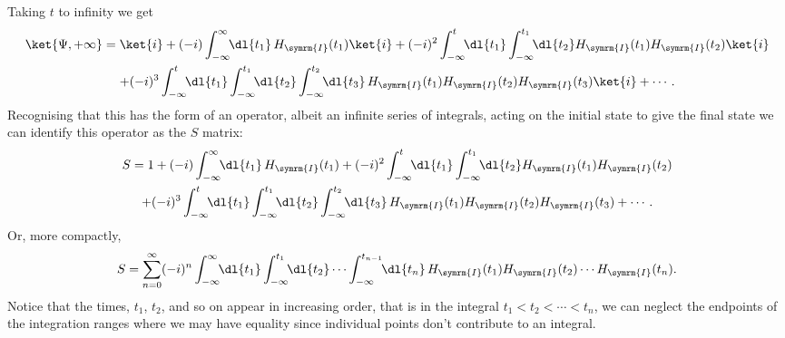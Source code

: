 \documentclass[fleqn]{NotesClass}
\newcommand{\ident}{1}
\newcommand{\interaction}{\symrm{I}}
\begin{document}
    Taking \(t\) to infinity we get
    \begin{multline}
        \ket{\Psi, +\infty} = \ket{i} + (-i) \int_{-\infty}^{\infty} \!\! \dl{t_1} \, H_{\interaction}(t_1) \ket{i} + (-i)^2 \int_{-\infty}^{t} \!\! \dl{t_1} \int_{-\infty}^{t_1} \!\! \dl{t_2} H_{\interaction}(t_1) H_{\interaction}(t_2) \ket{i}\\
        + (-i)^3 \int_{-\infty}^{t} \!\! \dl{t_1} \int_{-\infty}^{t_1} \!\! \dl{t_2} \int_{-\infty}^{t_2} \!\! \dl{t_3} \, H_{\interaction}(t_1) H_{\interaction}(t_2) H_{\interaction}(t_3) \ket{i} + \dotsb.
    \end{multline}
    Recognising that this has the form of an operator, albeit an infinite series of integrals, acting on the initial state to give the final state we can identify this operator as the \(S\) matrix:
    \begin{multline}
        S = \ident + (-i) \int_{-\infty}^{\infty} \!\! \dl{t_1} \, H_{\interaction}(t_1) + (-i)^2 \int_{-\infty}^{t} \!\! \dl{t_1} \int_{-\infty}^{t_1} \!\! \dl{t_2} H_{\interaction}(t_1) H_{\interaction}(t_2)\\
        + (-i)^3 \int_{-\infty}^{t} \!\! \dl{t_1} \int_{-\infty}^{t_1} \!\! \dl{t_2} \int_{-\infty}^{t_2} \!\! \dl{t_3} \, H_{\interaction}(t_1) H_{\interaction}(t_2) H_{\interaction}(t_3) + \dotsb.
    \end{multline}
    Or, more compactly,
    \begin{equation}
        S = \sum_{n = 0}^{\infty} (-i)^n \int_{-\infty}^{\infty} \!\! \dl{t_1} \int_{-\infty}^{t_1} \!\! \dl{t_2} \dotsm \int_{-\infty}^{t_{n-1}} \!\! \dl{t_n} \, H_{\interaction}(t_1) H_{\interaction}(t_2) \dotsm H_{\interaction}(t_n).
    \end{equation}
    Notice that the times, \(t_1\), \(t_2\), and so on appear in increasing order, that is in the integral \(t_1 < t_2 < \dotsb < t_n\), we can neglect the endpoints of the integration ranges where we may have equality since individual points don't contribute to an integral.
    
\end{document}
